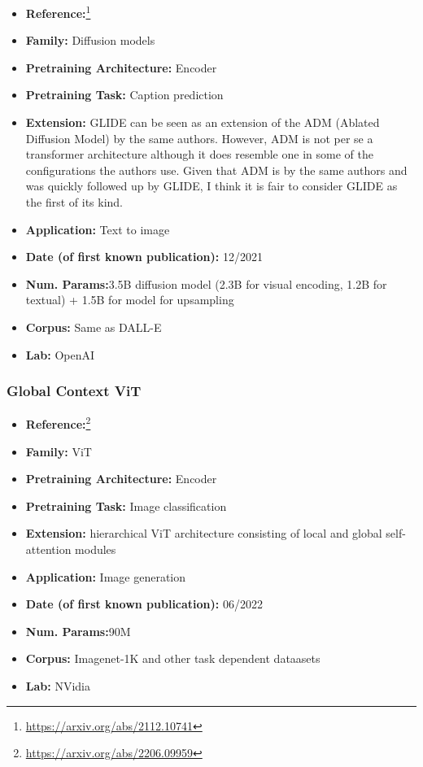 \documentclass{article}
\begin{document}
            \begin{itemize}
                \item \textbf{Reference:}\footnote{\url{https://arxiv.org/abs/2112.10741}}\cite{nichol2021glide}
                \item \textbf{Family:} Diffusion models 
                \item \textbf{Pretraining Architecture:} Encoder
                \item \textbf{Pretraining Task:}  Caption prediction
                \item \textbf{Extension:} GLIDE can be seen as an extension of the ADM (Ablated Diffusion Model) by the same authors. However, ADM is not per se a transformer architecture although it does resemble one in some of the configurations the authors use. Given that ADM is by the same authors and was quickly followed up by GLIDE, I think it is fair to consider GLIDE as the first of its kind.  
                \item \textbf{Application:} Text to image
                \item \textbf{Date (of first known publication):} 12/2021
                \item \textbf{Num. Params:}3.5B diffusion model (2.3B for visual encoding, 1.2B for textual) + 1.5B for model for upsampling
                \item \textbf{Corpus:} Same as DALL-E
                \item \textbf{Lab:} OpenAI
            \end{itemize}

\subsubsection{Global Context ViT}

            \begin{itemize}
                \item \textbf{Reference:}\footnote{\url{https://arxiv.org/abs/2206.09959}}\cite{hatamizadeh2022global}
                \item \textbf{Family:} ViT 
                \item \textbf{Pretraining Architecture:} Encoder
                \item \textbf{Pretraining Task:} Image classification
                \item \textbf{Extension:} hierarchical ViT architecture consisting of local and global self-attention modules  
                \item \textbf{Application:} Image generation
                \item \textbf{Date (of first known publication):} 06/2022
                \item \textbf{Num. Params:}90M
                \item \textbf{Corpus:} Imagenet-1K and other task dependent dataasets
                \item \textbf{Lab:} NVidia
            \end{itemize}
\end{document}
